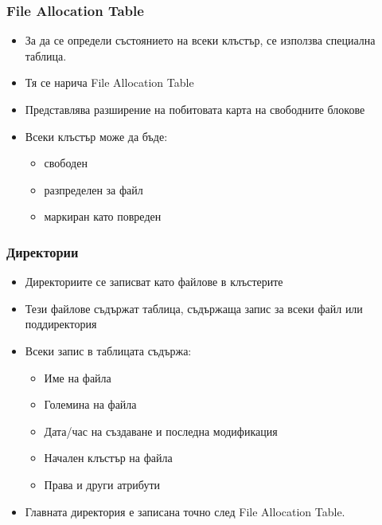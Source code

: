 \documentclass[ignorenonframetext, hyperref=unicode]{beamer}
\begin{document}
\begin{frame}
\frametitle{File Allocation Table}
\begin{itemize}
  \item За да се определи състоянието на всеки клъстър, се използва специална таблица.
  \item Тя се нарича File Allocation Table
  \item Представлява разширение на побитовата карта на свободните блокове
  \item Всеки клъстър може да бъде:
  \begin{itemize}
    \item свободен
	\item разпределен за файл
	\item маркиран като повреден
  \end{itemize}
\end{itemize}
\end{frame}

\begin{frame}
\frametitle{Директории}
\begin{itemize}
  \item Директориите се записват като файлове в клъстерите
  \item Тези файлове съдържат таблица, съдържаща запис за всеки файл или поддиректория
  \item Всеки запис в таблицата съдържа: 
  \begin{itemize}
    \item Име на файла
	\item Големина на файла
	\item Дата/час на създаване и последна модификация
	\item Начален клъстър на файла
	\item Права и други атрибути
  \end{itemize}
  \item Главната директория е записана точно след File Allocation Table.
\end{itemize}
\end{frame}
\end{document}
